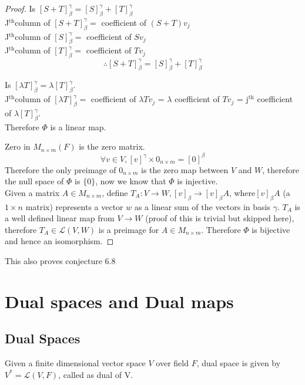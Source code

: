 \documentclass[11pt,a4paper]{colorart}
\def\l{\left}
\def\r{\right}
\def\b{\beta}
\def\g{\gamma}
\def\L{\mathcal{L}}
\begin{document}
\begin{proof}
	Is $\l[S+T\r]_\b^\g =  \l[S\r]_\b^\g + \l[T\r]_\b^\g$\\
	J$^\text{th}$column of $\l[S+T\r]_\b^\g =$ coefficient of $\l(S+T\r)v_j$\\ 
	J$^\text{th}$column of $\l[S\r]_\b^\g =$ coefficient of $Sv_j$\\ 
	J$^\text{th}$column of $\l[T\r]_\b^\g =$ coefficient of $Tv_j$\\ 
	\[ \therefore \l[S+T\r]_\b^\g = \l[S\r]_\b^\g + \l[T\r]_\b^\g \]
	
	Is $\l[\lambda T\r]_\b^\g =  \lambda \l[T\r]_\b^\g$.\\
	J$^\text{th}$column of $\l[\lambda T\r]_\b^\g =$ coefficient of $\lambda Tv_j$ = $\lambda$  coefficient of $Tv_j$ = j$^\text{th}$ coefficient of $\lambda\l[T\r]_\b^\g$.\\
	Therefore $\Phi$ is a linear map.

	Zero in $M_{n\times m}\l(F\r)$ is the zero matrix.\\
	\[ \forall v \in V, \l[v\r]^\g \times 0_{n\times m} = \l[0\r]^\b \]
	Therefore the only preimage of $0_{n\times m}$ is the zero map between $V$ and $W$, therefore the null space of $\Phi$ is $\{0\}$, now we know that $\Phi$ is injective.\\
	Given a matrix $A\in M_{n\times m}$, define $T_A:V\rightarrow W,\l[v\r]_\b \rightarrow \l[v\r]_\b A $, where$ \l[v\r]_\b A$ (a $1\times n$ matrix) represents a vector $w$ as a linear sum of the vectors in basis $\g$. $T_A$ is a well defined linear map from $V \rightarrow W$ (proof of this is trivial but skipped here), therefore $T_A\in \L\l(V,W\r)$ is a preimage for $A\in M_{n\times m}$. Therefore $\Phi$ is bijective and hence an isomorphism.
	\end{proof}

\begin{remark}
	This also proves conjecture 6.8
\end{remark}

\section{Dual spaces and Dual maps}

\subsection{Dual Spaces}

\begin{definition}
	Given a finite dimensional vector space $V$ over field $F$, dual space is given by $V^* = \L\l(V,F\r)$, called as dual of V. 
\end{definition}
\end{document}
